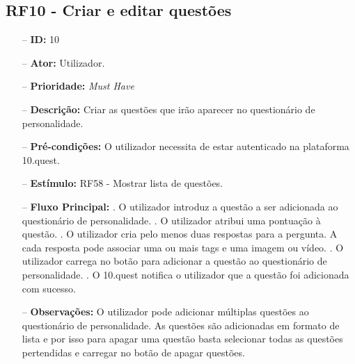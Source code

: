 \subsection{RF10 - Criar e editar questões}
\begin{itemize}
	\item[--] \textbf{ID:} 10
	\item[--]  \textbf{Ator:} Utilizador.
	\item[--]  \textbf{Prioridade:} \textit{Must Have}
	\item[--]  \textbf{Descrição:} Criar as questões que irão aparecer no questionário de personalidade.
	\item[--]  \textbf{Pré-condições:} O utilizador necessita de estar autenticado na plataforma 10.quest.
	\item[--]  \textbf{Estímulo:}  
		\subitem RF58 - Mostrar lista de questões.
	\item[--]  \textbf{Fluxo Principal:} 
		. O utilizador introduz a questão a ser adicionada ao questionário de personalidade.
		. O utilizador atribui uma pontuação à questão.
		. O utilizador cria pelo menos duas respostas para a pergunta. A cada resposta pode associar uma ou mais tags e uma imagem ou vídeo.
		. O utilizador carrega no botão para adicionar a questão ao questionário de personalidade.
		. O 10.quest notifica o utilizador que a questão foi adicionada com sucesso.
	\item[--]  \textbf{Observações:} O utilizador pode adicionar múltiplas questões ao questionário de personalidade. As questões são adicionadas em formato de lista e por isso para apagar uma questão basta selecionar todas as questões pertendidas e carregar no botão de apagar questões.
\end{itemize}
\newpage

